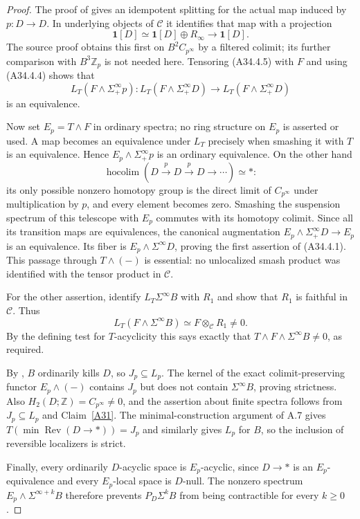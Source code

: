 \begin{proof}
The proof of \citet[Proposition 4.11, pp.~31--32 in arXiv v2]{A3CSYCyclotomic2024}
gives an idempotent splitting for the actual map induced by
$p:D\to D$.  In underlying objects of $\mathcal C$ it identifies
that map with a projection
\[
 \mathbf1[D]\simeq\mathbf1[D]\oplus R_\infty
 \longrightarrow\mathbf1[D].
 \tag{A34.4.5}
\]
The source proof obtains this first on $B^2C_{p^\infty}$ by a
filtered colimit; its further comparison with $B^3\mathbb Z_p$
is not needed here.  Tensoring \textup{(A34.4.5)} with $F$ and
using \textup{(A34.4.4)} shows that
\[
 L_T(F\wedge\Sigma^\infty_+p)
 :L_T(F\wedge\Sigma^\infty_+D)
 \longrightarrow L_T(F\wedge\Sigma^\infty_+D)
\]
is an equivalence.

Now set $E_p=T\wedge F$ in ordinary spectra; no ring structure on
$E_p$ is asserted or used.  A map becomes an
equivalence under $L_T$ precisely when smashing it with $T$
is an equivalence.  Hence $E_p\wedge\Sigma^\infty_+p$ is an
ordinary equivalence.  On the other hand
\[
 \operatorname*{hocolim}
 (D\xrightarrow{p}D\xrightarrow{p}D\longrightarrow\cdots)
 \simeq *:
\]
its only possible nonzero homotopy group is the direct limit of
$C_{p^\infty}$ under multiplication by $p$, and every element
becomes zero.  Smashing the suspension spectrum of this telescope
with $E_p$ commutes with its homotopy colimit.  Since all its
transition maps are equivalences, the canonical augmentation
$E_p\wedge\Sigma^\infty_+D\to E_p$ is an equivalence.
Its fiber is $E_p\wedge\Sigma^\infty D$, proving the first
assertion of \textup{(A34.4.1)}.  This passage through $T\wedge(-)$
is essential: no unlocalized smash product was identified with
the tensor product in $\mathcal C$.

For the other assertion,
\citet[Proposition 4.5 with $r=1$, and Proposition 4.9(2)]{A3CSYCyclotomic2024}
identify $L_T\Sigma^\infty B$ with $R_1$ and show that $R_1$
is faithful in $\mathcal C$.  Thus
\[
 L_T(F\wedge\Sigma^\infty B)
 \simeq F\otimes_{\mathcal C}R_1\ne0.
\]
By the defining test for $T$-acyclicity this says exactly that
$T\wedge F\wedge\Sigma^\infty B\ne0$, as required.

By \citet[Lemma 8.13]{ABousfield1997}, $B$ ordinarily kills $D$,
so $J_p\subseteq L_p$.  The kernel of the exact
colimit-preserving functor $E_p\wedge(-)$ contains $J_p$ but
does not contain $\Sigma^\infty B$, proving strictness.
Also $H_2(D;\mathbb Z)=C_{p^\infty}\ne0$, and the assertion
about finite spectra follows from $J_p\subseteq L_p$ and
Claim~\ref{A31}.  The minimal-construction argument of A.7 gives
$T(\min\operatorname{Rev}(D\to*))=J_p$ and similarly gives
$L_p$ for $B$, so the inclusion of reversible localizers is strict.

Finally, every ordinarily $D$-acyclic space is $E_p$-acyclic,
since $D\to *$ is an $E_p$-equivalence and every
$E_p$-local space is $D$-null.  The nonzero spectrum
$E_p\wedge\Sigma^{\infty+k}B$ therefore prevents
$P_D\Sigma^kB$ from being contractible for every $k\geq0$.
\end{proof}

